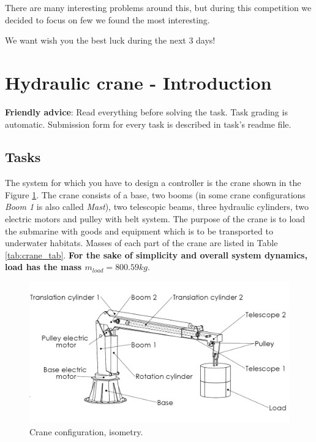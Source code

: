 \documentclass{article}
\begin{document}
	There are many interesting problems around this, but during this 
	competition we decided to focus on few we found the most interesting.
	
	We want wish you the best luck during the next 3 days!
	
	
	\newpage
	\section{Hydraulic crane - Introduction}
	
	
	
	\noindent 
	\textbf{Friendly advice}: Read everything before solving the task. Task grading is automatic. Submission form for every task is described in task's readme file.
	
	\subsection{Tasks} \label{sec:tasks}
	
	The system for which you have to design a controller is the crane shown in 
	the Figure \ref{fig:isometry}. The crane consists of a base, two booms (in 
	some crane configurations \textit{Boom 1} is also called \textit{Mast}), 
	two telescopic beams, three hydraulic cylinders, two electric motors and 
	pulley with belt system. The purpose of the crane is to load the submarine 
	with goods and equipment which is to be transported to underwater habitats. 
	Masses of each part of the crane are listed in Table 
	\ref{tab:crane_tab}.\textbf{ For the sake of simplicity and overall system 
	dynamics, load has the mass $m_{load} = 800.59 kg$}.
	
	\begin{figure}[h!]
		\centering
		\includegraphics[width=\textwidth]{kran_teret_izometrija.jpg}
		\caption{Crane configuration, isometry.}
		\label{fig:isometry}
	\end{figure}
	
\end{document}
